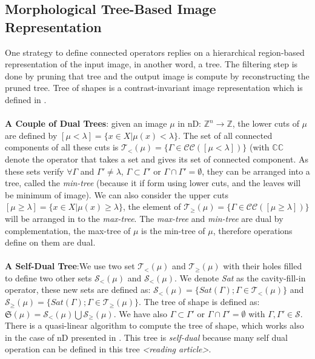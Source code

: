 \subsection{Morphological Tree-Based Image Representation}
One strategy to define connected operators replies on a hierarchical region-based representation of the input image, in another word, a tree. The filtering step is done by pruning that tree and the output image is compute by reconstructing the pruned tree.  Tree of shapes is a contrast-invariant image representation which is defined in \cite{Monasse.2000}.
\paragraph{} \textbf{A Couple of Dual Trees}: given an image $\mu $ in nD: $\mathbb{Z}^{n} \rightarrow \mathbb{Z} $, the lower cuts of $\mu$ are defined by 
	$[\mu < \lambda] =\lbrace x \in X \vert \mu (x) < \lambda \rbrace $. The set of all connected components of all these cuts is $ \mathcal{T}_< (\mu) =\lbrace \Gamma \in \mathcal{C}\mathcal{C}([\mu < \lambda]) \rbrace $ (with $\mathbb{C}\mathbb{C}$ denote the operator that takes a set and gives its set of connected component. As these sets verify $\forall \Gamma$ and $\Gamma ' \neq \lambda$, $\Gamma \subset \Gamma ' $ or $\Gamma \cap \Gamma '= \emptyset$, they can be arranged into a tree, called the \textit{min-tree} (because it if form using lower cuts, and the leaves will be minimum of image). We can also consider the upper cuts $[\mu \geq \lambda] =\lbrace x \in X \vert \mu (x) \geq \lambda \rbrace $, the element of $ \mathcal{T}_\geq (\mu) =\lbrace \Gamma \in \mathcal{C}\mathcal{C}([\mu \geq \lambda]) \rbrace $ will be arranged in to the \textit{max-tree}. The \textit{max-tree} and \textit{min-tree} are dual by complementation, the max-tree of $\mu$ is the min-tree of $ \mu$, therefore operations define on them are dual.
	
\paragraph{} \textbf{A Self-Dual Tree}:We use two set $ \mathcal{T}_< (\mu)$ and $ \mathcal{T}_\geq (\mu)$ with their holes filled to define two other sets $ \mathcal{S}_< (\mu)$ and $ \mathcal{S}_< (\mu)$. We denote \textit{Sat} as the cavity-fill-in operator, these new sets are defined as: $ \mathcal{S}_< (\mu) = \lbrace Sat(\Gamma);\Gamma \in \mathcal{T}_<(\mu)\rbrace$ and $ \mathcal{S}_\geq (\mu) = \lbrace Sat(\Gamma);\Gamma \in \mathcal{T}_\geq (\mu)\rbrace$. The tree of shape is defined as: $\mathfrak{S}(\mu) = \mathcal{S}_< (\mu) \bigcup \mathcal{S}_\geq (\mu) $. We have also $\Gamma \subset \Gamma ' $ or $\Gamma \cap \Gamma '= \emptyset$ with $\Gamma , \Gamma ' \in \mathcal{S}$. There is a quasi-linear algorithm to compute the tree of shape, which works also in the case of nD presented in \cite{geraud.13.ismm}. This tree is \textit{self-dual} because many self dual operation can be defined in this tree \textit{<reading article>}.

